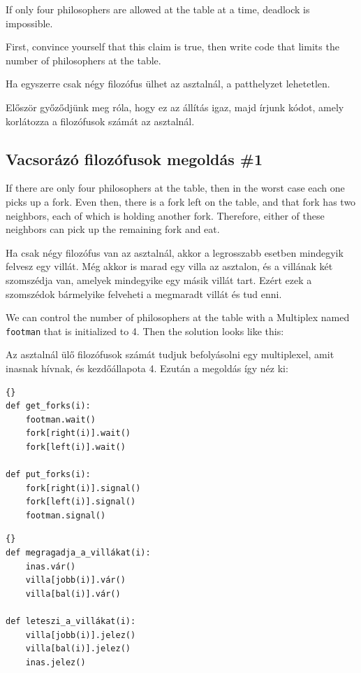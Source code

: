\documentclass{book}
\newcommand{\clearemptydoublepage}{\newpage\cleardoublepage}
\begin{document}
If only four philosophers are allowed at the table at a time,
deadlock is impossible.

First, convince yourself that this claim is true, then write code that
limits the number of philosophers at the table.

Ha egyszerre csak négy filozófus ülhet az asztalnál, a patthelyzet lehetetlen.

Először győződjünk meg róla, hogy ez az állítás igaz, majd írjunk kódot,
amely korlátozza a filozófusok számát az asztalnál.

\clearemptydoublepage
\subsection{Vacsorázó filozófusok megoldás \#1}

If there are only four philosophers at the table, then in the
worst case each one picks up a fork.  Even then, there is a fork
left on the table, and that fork has two neighbors, each of
which is holding another fork.  Therefore, either of these
neighbors can pick up the remaining fork and eat.

Ha csak négy filozófus van az asztalnál, akkor a legrosszabb
esetben mindegyik felvesz egy villát. Még akkor is marad egy
villa az asztalon, és a villának két szomszédja van, amelyek
mindegyike egy másik villát tart. Ezért ezek a szomszédok
bármelyike felveheti a megmaradt villát és tud enni.

We can control the number of philosophers at the table with
a Multiplex named {\tt footman} that is initialized to 4.
Then the solution looks like this:


Az asztalnál ülő filozófusok számát tudjuk befolyásolni egy
multiplexel, amit inasnak hívnak, és kezdőállapota 4. Ezután
a megoldás így néz ki:

\begin{lstlisting}[title={Dining philosophers solution \#1}]{}
def get_forks(i):
    footman.wait()
    fork[right(i)].wait()
    fork[left(i)].wait()

def put_forks(i):
    fork[right(i)].signal()
    fork[left(i)].signal()
    footman.signal()
\end{lstlisting}

\begin{lstlisting}[title={Vacsorázó filozófusok megoldás \#1}]{}
def megragadja_a_villákat(i):
    inas.vár()
    villa[jobb(i)].vár()
    villa[bal(i)].vár()

def leteszi_a_villákat(i):
    villa[jobb(i)].jelez()
    villa[bal(i)].jelez()
    inas.jelez()
\end{lstlisting}
\end{document}

